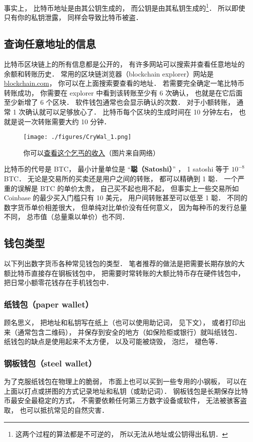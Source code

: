 事实上， 比特币地址是由其公钥生成的， 而公钥是由其私钥生成的\footnote{这两个过程的算法都是不可逆的， 所以无法从地址或公钥得出私钥．}． 所以即使只有你的私钥泄露， 同样会导致比特币被盗．

\subsection{查询任意地址的信息}
比特币区块链上的所有信息都是公开的， 有许多网站可以搜索并查看任意地址的余额和转账历史． 常用的区块链浏览器（blockchain explorer）网站是 \href{https://blockchain.com}{blockchain.com}， 你可以在上面搜索要查看的地址． 若需要完全确定一笔比特币转账成功， 你需要在 explorer 中看到该转账至少有 6 次确认， 也就是在它后面至少新增了 6 个区块． 软件钱包通常也会显示确认的次数． 对于小额转账， 通常 1 次确认就可以足够放心了． 比特币每个区块的生成时间在 10 分钟左右， 也就是说一次转账需要大约 10 分钟．
\begin{figure}[ht]
\centering
\texttt{[image: ./figures/CryWal\_1.png]}
\caption{你可以\href{https://www.blockchain.com/btc/address/1DBqpfptUMizLDACvMVsrJFPdMtbgmZCk1}{查看这个乞丐的收入}（图片来自网络）} \label{CryWal_fig1}
\end{figure}

比特币的代号是 BTC， 最小计量单位是 “\textbf{聪（Satoshi）}” ， 1 satoshi 等于 $10^{-8}$ BTC． 无论是交易所的买卖还是用户之间的转账， 都可以精确到 1 聪． 一个严重的误解是 BTC 的单价太贵， 自己买不起也用不起， 但事实上一些交易所如 Coinbase 的最少买入门槛只有 10 美元， 用户间转账甚至可以低至 1 聪． 不同的数字货币单价相差很大， 但单纯对比单价没有任何意义， 因为每种币的发行总量不同， 总市值（总量乘以单价）也不同．

\subsection{钱包类型}
以下列出数字货币各种常见钱包的类型． 笔者推荐的做法是把需要长期存放的大额比特币直接存在钢板钱包中， 把需要时常转账的大额比特币存在硬件钱包中，把日常小额零花钱存在手机钱包中．

\subsubsection{纸钱包（paper wallet）}
顾名思义， 把地址和私钥写在纸上（也可以使用助记词， 见下文）， 或者打印出来（通常包含二维码）， 并保存到安全的地方（如保险柜或银行）就叫纸钱包． 纸钱包的缺点是使用起来不太方便， 以及可能被烧毁， 泡烂， 褪色等．

\subsubsection{钢板钱包（steel wallet）}
为了克服纸钱包在物理上的脆弱， 市面上也可以买到一些专用的小钢板， 可以在上面以打点或拼图的方式记录地址和私钥（或助记词）． 钢板钱包是长期保存比特币最安全最稳定的方式， 不需要依赖任何第三方数字设备或软件， 无法被骇客盗取， 也可以抵抗常见的自然灾害．

